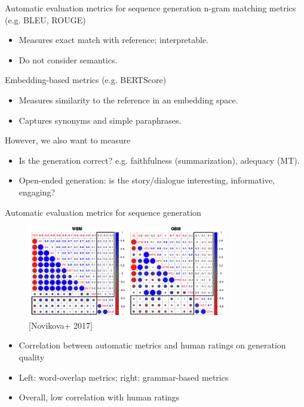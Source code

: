 \documentclass[usenames,dvipsnames,notes]{beamer}
\begin{document}
\begin{frame}
    {Automatic evaluation metrics for sequence generation}
    n-gram matching metrics (e.g. BLEU, ROUGE)\\
    \begin{itemize}
        \item Measures exact match with reference; interpretable.
        \item Do not consider semantics.
    \end{itemize}

    Embedding-based metrics (e.g. BERTScore)\\
    \begin{itemize}
        \item Measures similarity to the reference in an embedding space.
        \item Captures synonyms and simple paraphrases.
    \end{itemize}

    However, we also want to measure\\
    \begin{itemize}
        \item Is the generation correct? e.g. faithfulness (summarization), adequacy (MT).
        \item Open-ended generation: is the story/dialogue interesting, informative, engaging?
    \end{itemize}
\end{frame}

\begin{frame}
    {Automatic evaluation metrics for sequence generation}
    \begin{figure}
        \includegraphics[height=4cm]{figures/auto-eval}
        \caption{[Novikova+ 2017]}
    \end{figure}
    \vspace{-1em}
    \begin{itemize}
        \item Correlation between automatic metrics and human ratings on generation quality
        \item Left: word-overlap metrics; right: grammar-based metrics
        \item Overall, low correlation with human ratings
    \end{itemize}
\end{frame}
\end{document}
